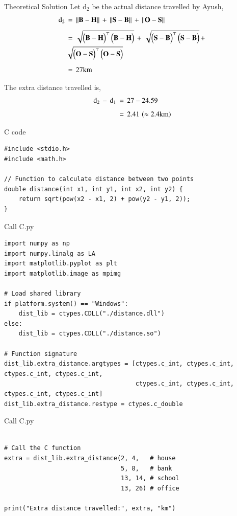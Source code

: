 \documentclass{beamer}
\begin{document}
\begin{frame}{Theoretical Solution}
Let d$_2$ be the actual distance travelled by Ayush,
\begin{align}
    \text{d}_2\,&=\,||\mathbf{B}-\mathbf{H}||\,+\,||\mathbf{S}-\mathbf{B}||\,+\,||\mathbf{O}-\mathbf{S}||\\[4pt]
    \,&=\,\sqrt{\begin{pmatrix}\mathbf{B-H}\end{pmatrix}^\top\begin{pmatrix}\mathbf{B-H}\end{pmatrix}}\,+\,\sqrt{\begin{pmatrix}\mathbf{S-B}\end{pmatrix}^\top\begin{pmatrix}\mathbf{S-B}\end{pmatrix}}\,+\,\\&\sqrt{\begin{pmatrix}\mathbf{O-S}\end{pmatrix}^\top\begin{pmatrix}\mathbf{O-S}\end{pmatrix}}\\[5pt]
     \,&=\,27\text{km}
\end{align}

The extra distance travelled is,
\begin{align}
    \text{d}_2\,-\,\text{d}_1\,&=\,27-24.59\\[4pt]
    \,&=\,2.41\,\left(\approx2.4\text{km}\right)
\end{align}
\end{frame}

\begin{frame}[fragile]{C code}
\begin{lstlisting}
#include <stdio.h>
#include <math.h>

// Function to calculate distance between two points
double distance(int x1, int y1, int x2, int y2) {
    return sqrt(pow(x2 - x1, 2) + pow(y2 - y1, 2));
}
\end{lstlisting}
\end{frame}

\begin{frame}[fragile]{Call C.py}
\begin{lstlisting}
import numpy as np
import numpy.linalg as LA
import matplotlib.pyplot as plt
import matplotlib.image as mpimg

# Load shared library
if platform.system() == "Windows":
    dist_lib = ctypes.CDLL("./distance.dll")
else:
    dist_lib = ctypes.CDLL("./distance.so")

# Function signature
dist_lib.extra_distance.argtypes = [ctypes.c_int, ctypes.c_int, ctypes.c_int, ctypes.c_int,
                                    ctypes.c_int, ctypes.c_int, ctypes.c_int, ctypes.c_int]
dist_lib.extra_distance.restype = ctypes.c_double
\end{lstlisting}
\end{frame}

\begin{frame}[fragile]{Call C.py}
\begin{lstlisting}

# Call the C function
extra = dist_lib.extra_distance(2, 4,   # house
                                5, 8,   # bank
                                13, 14, # school
                                13, 26) # office

print("Extra distance travelled:", extra, "km")

\end{lstlisting}
\end{frame}
\end{document}
